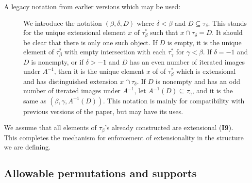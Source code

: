 \documentclass[112pt]{article}
\begin{document}
\begin{description}
\item[A legacy notation from earlier versions which may be used:]  We introduce the notation $(\beta,\delta,D)$ where $\delta<\beta$ and  $D \subseteq \tau_\delta$.   This stands for the unique extensional element $x$ of $\tau_\beta^*$ such that $x \cap \tau_\delta = D$.  It should be clear that there is only one such object.  If $D$ is empty, it is the unique
element of $\tau_\beta^*$ with empty intersection with each $\tau_\gamma^*$ for $\gamma<\beta$.  If $\delta=-1$ and $D$ is nonempty, or if $\delta >-1$
and $D$ has an even number of iterated images under $A^{-1}$, then it is the unique element $x$ of of $\tau_\beta^*$ which is extensional and has distinguished extension $x \cap \tau_\delta$.  If $D$ is nonempty and has an odd number of iterated images under $A^{-1}$, let $A^{-1}(D) \subseteq \tau_\gamma$, and it is the same as $(\beta,\gamma,A^{-1}(D))$.  This notation is mainly for compatibility with previous versions of the paper, but may have its uses.

\end{description}

We assume that all elements of $\tau_\beta$'s already constructed are extensional ({\bf I9}).  This completes the mechanism for enforcement of extensionality in the structure we are defining.

\subsection{Allowable permutations and supports}
\end{document}
